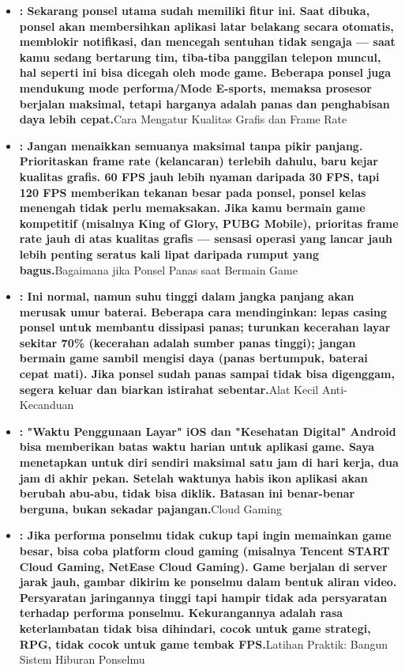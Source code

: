 \begin{itemize}
  \item \textbf{: Sekarang ponsel utama sudah memiliki fitur ini. Saat dibuka, ponsel akan membersihkan aplikasi latar belakang secara otomatis, memblokir notifikasi, dan mencegah sentuhan tidak sengaja — saat kamu sedang bertarung tim, tiba-tiba panggilan telepon muncul, hal seperti ini bisa dicegah oleh mode game. Beberapa ponsel juga mendukung mode performa/Mode E-sports, memaksa prosesor berjalan maksimal, tetapi harganya adalah panas dan penghabisan daya lebih cepat.}Cara Mengatur Kualitas Grafis dan Frame Rate
  \item \textbf{: Jangan menaikkan semuanya maksimal tanpa pikir panjang. Prioritaskan frame rate (kelancaran) terlebih dahulu, baru kejar kualitas grafis. 60 FPS jauh lebih nyaman daripada 30 FPS, tapi 120 FPS memberikan tekanan besar pada ponsel, ponsel kelas menengah tidak perlu memaksakan. Jika kamu bermain game kompetitif (misalnya King of Glory, PUBG Mobile), prioritas frame rate jauh di atas kualitas grafis — sensasi operasi yang lancar jauh lebih penting seratus kali lipat daripada rumput yang bagus.}Bagaimana jika Ponsel Panas saat Bermain Game
  \item \textbf{: Ini normal, namun suhu tinggi dalam jangka panjang akan merusak umur baterai. Beberapa cara mendinginkan: lepas casing ponsel untuk membantu dissipasi panas; turunkan kecerahan layar sekitar 70\% (kecerahan adalah sumber panas tinggi); jangan bermain game sambil mengisi daya (panas bertumpuk, baterai cepat mati). Jika ponsel sudah panas sampai tidak bisa digenggam, segera keluar dan biarkan istirahat sebentar.}Alat Kecil Anti-Kecanduan
  \item \textbf{: "Waktu Penggunaan Layar" iOS dan "Kesehatan Digital" Android bisa memberikan batas waktu harian untuk aplikasi game. Saya menetapkan untuk diri sendiri maksimal satu jam di hari kerja, dua jam di akhir pekan. Setelah waktunya habis ikon aplikasi akan berubah abu-abu, tidak bisa diklik. Batasan ini benar-benar berguna, bukan sekadar pajangan.}Cloud Gaming
  \item \textbf{: Jika performa ponselmu tidak cukup tapi ingin memainkan game besar, bisa coba platform cloud gaming (misalnya Tencent START Cloud Gaming, NetEase Cloud Gaming). Game berjalan di server jarak jauh, gambar dikirim ke ponselmu dalam bentuk aliran video. Persyaratan jaringannya tinggi tapi hampir tidak ada persyaratan terhadap performa ponselmu. Kekurangannya adalah rasa keterlambatan tidak bisa dihindari, cocok untuk game strategi, RPG, tidak cocok untuk game tembak FPS.}Latihan Praktik: Bangun Sistem Hiburan Ponselmu
\end{itemize}

